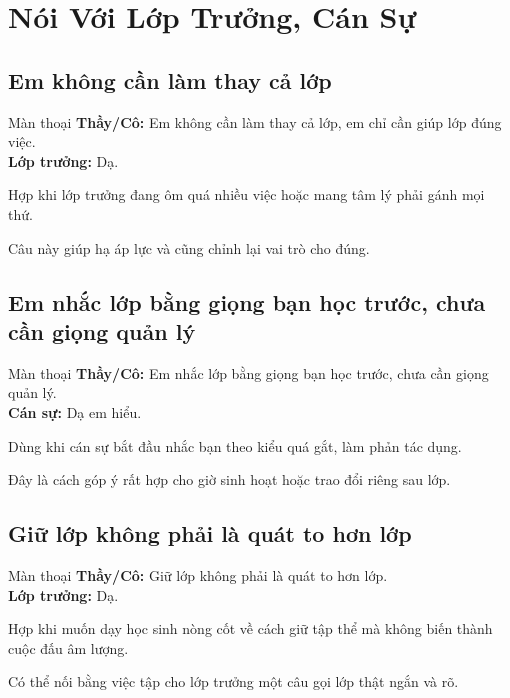 \chapter{Nói Với Lớp Trưởng, Cán Sự}

\section{Em không cần làm thay cả lớp}
\begin{manthoai}{Màn thoại}
\textbf{Thầy/Cô:} Em không cần làm thay cả lớp, em chỉ cần giúp lớp đúng việc.\\
\textbf{Lớp trưởng:} Dạ.
\end{manthoai}
\begin{dungkhinào}
Hợp khi lớp trưởng đang ôm quá nhiều việc hoặc mang tâm lý phải gánh mọi thứ.
\end{dungkhinào}
\begin{nhipthem}
Câu này giúp hạ áp lực và cũng chỉnh lại vai trò cho đúng.
\end{nhipthem}
\ngancach

\section{Em nhắc lớp bằng giọng bạn học trước, chưa cần giọng quản lý}
\begin{manthoai}{Màn thoại}
\textbf{Thầy/Cô:} Em nhắc lớp bằng giọng bạn học trước, chưa cần giọng quản lý.\\
\textbf{Cán sự:} Dạ em hiểu.
\end{manthoai}
\begin{dungkhinào}
Dùng khi cán sự bắt đầu nhắc bạn theo kiểu quá gắt, làm phản tác dụng.
\end{dungkhinào}
\begin{nhipthem}
Đây là cách góp ý rất hợp cho giờ sinh hoạt hoặc trao đổi riêng sau lớp.
\end{nhipthem}
\ngancach

\section{Giữ lớp không phải là quát to hơn lớp}
\begin{manthoai}{Màn thoại}
\textbf{Thầy/Cô:} Giữ lớp không phải là quát to hơn lớp.\\
\textbf{Lớp trưởng:} Dạ.
\end{manthoai}
\begin{dungkhinào}
Hợp khi muốn dạy học sinh nòng cốt về cách giữ tập thể mà không biến thành cuộc đấu âm lượng.
\end{dungkhinào}
\begin{nhipthem}
Có thể nối bằng việc tập cho lớp trưởng một câu gọi lớp thật ngắn và rõ.
\end{nhipthem}
\ngancach

